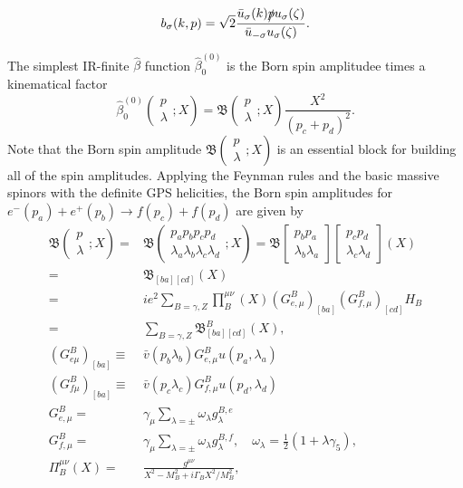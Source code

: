 \begin{equation}
b_\sigma(k,p)=\sqrt{2}\frac{\bar{u}_\sigma(k)\slashed p u_\sigma(\zeta)}{\bar{u}_{-\sigma}u_\sigma(\zeta)}.
\end{equation}

The simplest IR-finite $\hat{\beta}$ function $\hat{\beta}_0^{(0)}$ is the Born spin amplitudee times a kinematical factor
\begin{equation}
\widehat{\beta}^{(0)}_0\left(\begin{array}{c}
p\\\lambda
\end{array}
;X\right)
=\mathfrak{B}\left(\begin{array}{c}
p\\\lambda
\end{array}
;X\right)\frac{X^2}{(p_c+p_d)^2}.
\end{equation}
Note that the Born spin amplitude $\mathfrak{B}\left(\begin{array}{c}
p\\\lambda
\end{array}
;X\right)$ is an essential block for building all of the spin amplitudes. Applying the Feynman rules and the basic massive spinors with the definite GPS helicities, the Born spin amplitudes for $e^-(p_a)+e^+(p_b)\to f(p_c)+f(p_d)$ are given by 
\begin{align}
\mathfrak{B}\left(\begin{array}{c}
p\\\lambda
\end{array}
;X\right)=&\mathfrak{B}\left(\begin{array}{c}
p_ap_bp_cp_d\\\lambda_a\lambda_b\lambda_c\lambda_d
\end{array}
;X\right)
=\mathfrak{B}\left[\begin{array}{c}
p_bp_a\\\lambda_b\lambda_a
\end{array}
\right]\left[\begin{array}{c}
p_cp_d\\\lambda_c\lambda_d
\end{array}
\right](X)\nonumber\\
=&\mathfrak{B}_{[ba][cd]}(X)\nonumber\\
=&ie^2\sum_{B=\gamma,Z}\prod^{\mu\nu}_B(X)(G^B_{e,\mu})_{[ba]}(G^B_{f,\mu})_{[cd]}H_B\nonumber\\
=&\sum_{B=\gamma,Z}\mathfrak{B}^B_{[ba][cd]}(X),\nonumber\\
(G^B_{e\mu})_{[ba]}\equiv&\bar{v}(p_b\lambda_b)G^B_{e,\mu}u(p_a,\lambda_a)\nonumber\\
(G^B_{f\mu})_{[ba]}\equiv&\bar{v}(p_c\lambda_c)G^B_{f,\mu}u(p_d,\lambda_d)\nonumber\\
G^B_{e,\mu}=&\gamma_\mu\sum_{\lambda=\pm}\omega_\lambda g^{B,e}_\lambda\nonumber\\
G^B_{f,\mu}=&\gamma_\mu\sum_{\lambda=\pm}\omega_\lambda g^{B,f}_\lambda,\quad \omega_\lambda=\frac{1}{2}(1+\lambda\gamma_5),\nonumber\\
\Pi^{\mu\nu}_B(X)=&\frac{g^{\mu\nu}}{X^2-M^2_B+i\Gamma_BX^2/M_B^2},
\end{align}
